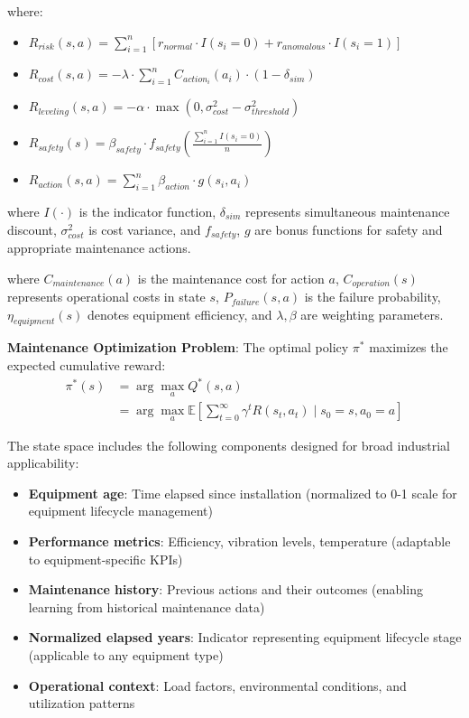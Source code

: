 \documentclass[twocolumn]{article}
\begin{document}
where:
\begin{itemize}
\item $R_{risk}(s,a) = \sum_{i=1}^{n} [r_{normal} \cdot I(s_i = 0) + r_{anomalous} \cdot I(s_i = 1)]$
\item $R_{cost}(s,a) = -\lambda \cdot \sum_{i=1}^{n} C_{action_i}(a_i) \cdot (1 - \delta_{sim})$ 
\item $R_{leveling}(s,a) = -\alpha \cdot \max(0, \sigma^2_{cost} - \sigma^2_{threshold})$
\item $R_{safety}(s) = \beta_{safety} \cdot f_{safety}(\frac{\sum_{i=1}^{n} I(s_i = 0)}{n})$
\item $R_{action}(s,a) = \sum_{i=1}^{n} \beta_{action} \cdot g(s_i, a_i)$
\end{itemize}

where $I(\cdot)$ is the indicator function, $\delta_{sim}$ represents simultaneous maintenance discount, $\sigma^2_{cost}$ is cost variance, and $f_{safety}$, $g$ are bonus functions for safety and appropriate maintenance actions.

where $C_{maintenance}(a)$ is the maintenance cost for action $a$, $C_{operation}(s)$ represents operational costs in state $s$, $P_{failure}(s,a)$ is the failure probability, $\eta_{equipment}(s)$ denotes equipment efficiency, and $\lambda, \beta$ are weighting parameters.

\textbf{Maintenance Optimization Problem}: The optimal policy $\pi^*$ maximizes the expected cumulative reward:
\begin{equation}
\begin{split}
\pi^*(s) &= \arg\max_a Q^*(s,a) \\
&= \arg\max_a \mathbb{E}\left[\sum_{t=0}^{\infty} \gamma^t R(s_t, a_t) \mid s_0 = s, a_0 = a\right]
\end{split}
\end{equation}

The state space includes the following components designed for broad industrial applicability:

\begin{itemize}
\item \textbf{Equipment age}: Time elapsed since installation (normalized to 0-1 scale for equipment lifecycle management)
\item \textbf{Performance metrics}: Efficiency, vibration levels, temperature (adaptable to equipment-specific KPIs)
\item \textbf{Maintenance history}: Previous actions and their outcomes (enabling learning from historical maintenance data)
\item \textbf{Normalized elapsed years}: Indicator representing equipment lifecycle stage (applicable to any equipment type)
\item \textbf{Operational context}: Load factors, environmental conditions, and utilization patterns
\end{itemize}
\end{document}
